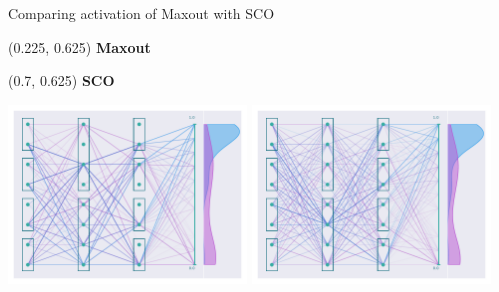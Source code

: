 \documentclass[UKenglish]{beamer}
\begin{document}
\begin{frame}{Comparing activation of Maxout with SCO}
    \begin{textblock}{0.8}(0.225, 0.625)
        \textbf{Maxout}
    \end{textblock}
    \begin{textblock}{0.8}(0.7, 0.625)
        \textbf{SCO}
    \end{textblock}
    \begin{center}
        \includegraphics[width = 0.475\textwidth]{figures/NetworkVis/AfterTraining.pdf}
        \includegraphics[width = 0.475\textwidth]{figures/NetworkVis/SCO/AfterTraining.pdf}
    \end{center}
\end{frame}
\end{document}
